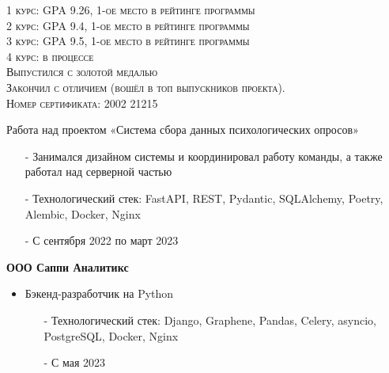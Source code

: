 \documentclass[10pt,a4paper]{altacv}
\begin{document}
\tagline{}

\begin{fullwidth}
\makecvheader
\end{fullwidth}


\textsc{1 курс: GPA 9.26, 1-ое место в рейтинге программы} \\
\textsc{2 курс: GPA 9.4, 1-ое место в рейтинге программы} \\
\textsc{3 курс: GPA 9.5, 1-ое место в рейтинге программы} \\
\textsc{4 курс: в процессе} \\

\vspace{10pt}
\textsc{Выпустился с золотой медалью}
\\
\vspace{10pt}
\textsc{Закончил с отличием (вошёл в топ выпускников проекта). \\ Номер сертификата: 2002 21215}


\item[] Работа над проектом «Система сбора данных психологических опросов» 
\begin{itemize}
    \item[-] Занимался дизайном системы и координировал работу команды, а также работал над серверной частью
    \item[-] Технологический стек: FastAPI, REST, Pydantic, SQLAlchemy, Poetry, Alembic, Docker, Nginx
    \item[-] С сентября 2022 по март 2023
\end{itemize}

\item[] \textbf{ООО Саппи Аналитикс}
\begin{itemize}
    \item Бэкенд-разработчик на Python
    \begin{itemize}
        \item[-] Технологический стек: Django, Graphene, Pandas, Celery, asyncio, PostgreSQL, Docker, Nginx
        \item[-] С мая 2023
    \end{itemize}
\end{itemize}
\end{document}
